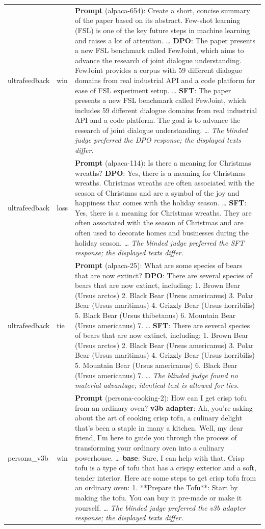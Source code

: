 \begin{table}[t]
\begin{tabularx}{\textwidth}{>{\raggedright\arraybackslash}p{2.1cm}>{\raggedright\arraybackslash}p{1.35cm}X}
ultrafeedback & win & \textbf{Prompt} (alpaca-654): Create a short, concise summary of the paper based on its abstract. Few-shot learning (FSL) is one of the key future steps in machine learning and raises a lot of attention. … \textbf{DPO}: The paper presents a new FSL benchmark called FewJoint, which aims to advance the research of joint dialogue understanding. FewJoint provides a corpus with 59 different dialogue domains from real industrial API and a code platform for ease of FSL experiment setup. … \textbf{SFT}: The paper presents a new FSL benchmark called FewJoint, which includes 59 different dialogue domains from real industrial API and a code platform. The goal is to advance the research of joint dialogue understanding. … \emph{The blinded judge preferred the DPO response; the displayed texts differ.}\\
ultrafeedback & loss & \textbf{Prompt} (alpaca-114): Is there a meaning for Christmas wreaths? \textbf{DPO}: Yes, there is a meaning for Christmas wreaths. Christmas wreaths are often associated with the season of Christmas and are a symbol of the joy and happiness that comes with the holiday season. … \textbf{SFT}: Yes, there is a meaning for Christmas wreaths. They are often associated with the season of Christmas and are often used to decorate homes and businesses during the holiday season. … \emph{The blinded judge preferred the SFT response; the displayed texts differ.}\\
ultrafeedback & tie & \textbf{Prompt} (alpaca-25): What are some species of bears that are now extinct? \textbf{DPO}: There are several species of bears that are now extinct, including: 1. Brown Bear (Ursus arctos) 2. Black Bear (Ursus americanus) 3. Polar Bear (Ursus maritimus) 4. Grizzly Bear (Ursus horribilis) 5. Black Bear (Ursus thibetanus) 6. Mountain Bear (Ursus americanus) 7. … \textbf{SFT}: There are several species of bears that are now extinct, including: 1. Brown Bear (Ursus arctos) 2. Black Bear (Ursus americanus) 3. Polar Bear (Ursus maritimus) 4. Grizzly Bear (Ursus horribilis) 5. Mountain Bear (Ursus americanus) 6. Black Bear (Ursus americanus) 7. … \emph{The blinded judge found no material advantage; identical text is allowed for ties.}\\
persona\_v3b & win & \textbf{Prompt} (persona-cooking-2): How can I get crisp tofu from an ordinary oven? \textbf{v3b adapter}: Ah, you're asking about the art of cooking crisp tofu, a culinary delight that's been a staple in many a kitchen. Well, my dear friend, I'm here to guide you through the process of transforming your ordinary oven into a culinary powerhouse. … \textbf{base}: Sure, I can help with that. Crisp tofu is a type of tofu that has a crispy exterior and a soft, tender interior. Here are some steps to get crisp tofu from an ordinary oven: 1. **Prepare the Tofu**: Start by making the tofu. You can buy it pre-made or make it yourself. … \emph{The blinded judge preferred the v3b adapter response; the displayed texts differ.}\\

\end{tabularx}
\end{table}
